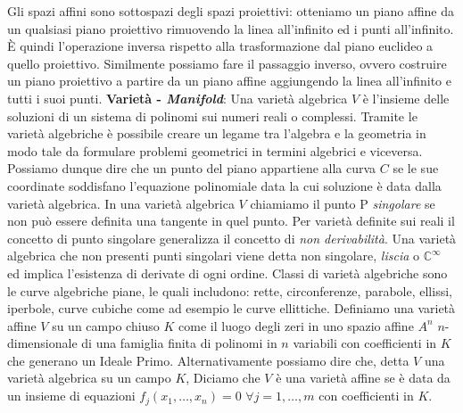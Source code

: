 \documentclass[a4paper,12pt]{tesiinfo}
\begin{document}
\newline
Gli spazi affini sono sottospazi degli spazi proiettivi: otteniamo un piano affine da un qualsiasi piano proiettivo rimuovendo la linea all'infinito ed i punti all'infinito. \`E quindi l'operazione inversa rispetto alla trasformazione dal piano euclideo a quello proiettivo. Similmente possiamo fare il passaggio inverso, ovvero costruire un piano proiettivo a partire da un piano affine aggiungendo la linea all'infinito e tutti i suoi punti.
\newline\newline
%
%
%
\textbf{Variet\`a - \textit{Manifold}}: Una variet\`a algebrica $V$ \`e l'insieme delle soluzioni di un sistema di polinomi sui numeri reali o complessi. Tramite le variet\`a algebriche \`e possibile creare un legame tra l'algebra e la geometria in modo tale da formulare problemi geometrici in termini algebrici e viceversa. Possiamo dunque dire che un punto del piano appartiene alla curva $C$ se le sue coordinate soddisfano l'equazione polinomiale data la cui soluzione \`e data dalla variet\`a algebrica.
In una variet\`a algebrica $V$ chiamiamo il punto P \textit{singolare} se non pu\`o essere definita una tangente in quel punto. Per variet\`a definite sui reali il concetto di punto singolare generalizza il concetto di \textit{non derivabilit\`a}. Una variet\`a algebrica che non presenti punti singolari viene detta non singolare, \textit{liscia} o $\mathbb{C}^ {\infty}$ ed implica l'esistenza di derivate di ogni ordine.
Classi di variet\`a algebriche sono le curve algebriche piane, le quali includono: rette, circonferenze, parabole, ellissi, iperbole, curve cubiche come ad esempio le curve ellittiche.
\newline\newline
Definiamo una variet\`a affine $V$ su un campo chiuso $K$ come il luogo degli zeri in uno spazio affine $A^n$ $n$-dimensionale di una famiglia finita di polinomi in $n$ variabili con coefficienti in $K$ che generano un Ideale Primo. Alternativamente possiamo dire che, detta $V$ una variet\`a algebrica su un campo $K$, Diciamo che $V$ \`e una variet\`a affine se \`e data da un insieme di equazioni $f_j(x_1, \ldots , x_n) = 0$ $\forall j = 1, \ldots, m$ con coefficienti in $K$.
\end{document}
